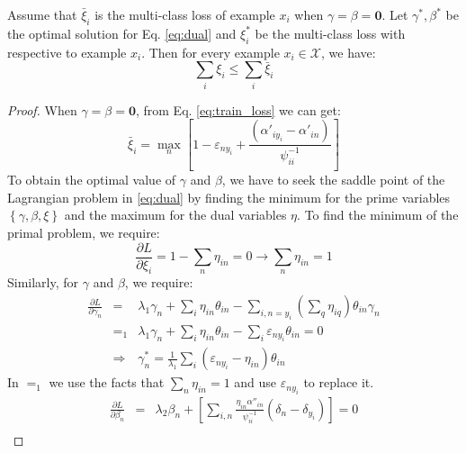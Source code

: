 \begin{theorem}\label{th:1}
Assume that $\bar \xi_i$ is the multi-class loss of example $x_i$ when $\gamma=\beta = \mathbf{0}$. Let $\gamma^*, \beta^*$ be the optimal solution for Eq. \eqref{eq:dual} and $\xi_i^*$ be the multi-class loss with respective to example $x_i$. Then for every example $x_i \in \mathcal{X}$, we have:\[\sum\limits_i {{\xi _i}}  \le \sum\limits_i {{{\bar \xi }_i}} \]
\end{theorem}
\begin{proof}
When $\gamma=\beta = \mathbf{0}$, from Eq. \eqref{eq:train_loss} we can get:
\begin{equation*}
{\bar \xi _i} = \mathop {\max }\limits_n \left[ {1 - {\varepsilon _{n{y_i}}} + \frac{{\left( {{{\alpha '}_{i{y_i}}} - {{\alpha '}_{in}}} \right)}}{{\psi _{ii}^{ - 1}}}} \right]
\end{equation*}
To obtain the optimal value of $\gamma$ and $\beta$, we have to seek the saddle point of the Lagrangian problem in \eqref{eq:dual} by finding the minimum for the prime variables $\left\{ \gamma, \beta, \xi \right\}$ and the maximum for the dual variables $\eta $. To find the minimum of the primal problem, we require:
\begin{equation*}
\frac{{\partial L}}{{\partial {\xi _i}}} = 1 - \sum\limits_n {{\eta _{in}}}  = 0 \to \sum\limits_n {{\eta _{in}}}  = 1
\end{equation*}   
Similarly, for $\gamma$ and $\beta$, we require:
\begin{eqnarray}\label{eq:opt_gama}
\frac{{\partial L}}{{\partial {\gamma _n}}} &=& {\lambda _1}{\gamma _n} + \sum\limits_i {{\eta _{in}}{\theta _{in}}}  - \sum\limits_{i,n = {y_i}} {\left( {\sum\limits_q {{\eta _{iq}}} } \right){\theta _{in}}{\gamma _n}}  \nonumber\\
&=_1 &{\lambda _1}{\gamma _n} + \sum\limits_i {{\eta _{in}}{\theta _{in}}}  - \sum\limits_i {{\varepsilon _{n{y_i}}}{\theta _{in}}}  = 0  \nonumber\\
&\Rightarrow & \gamma _n^* = \frac{1}{{{\lambda _1}}}\sum\limits_i {\left( {{\varepsilon _{n{y_i}}} - {\eta _{in}}} \right){\theta _{in}}} 
\end{eqnarray}
In $=_1$ we use the facts that $\sum_n\eta_{in}=1$ and use $\varepsilon_{ny_i}$ to replace it.
\begin{eqnarray}\label{eq:opt_beta}
\frac{{\partial L}}{{\partial {\beta _n}}} &=& {\lambda _2}{\beta _n} + \left[ {\sum\limits_{i,n} {\frac{{{\eta _{in}}{{\alpha ''}_{in}}}}{{\psi_{ii}^{ - 1}}}\left( {{\delta _n} - {\delta _{{y_i}}}} \right)} } \right] = 0 \nonumber \\

\end{eqnarray}
\end{proof}
